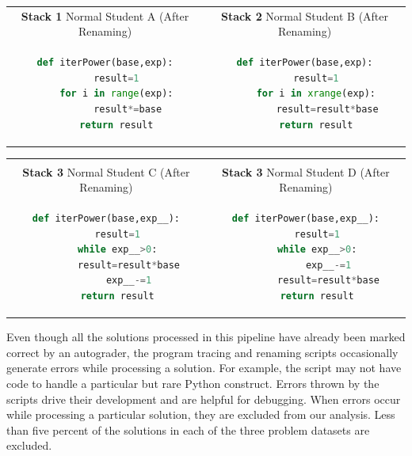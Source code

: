 \begin{tabular}{c|c}
{\bf Stack 1} Normal Student A (After Renaming) & {\bf Stack 2} Normal Student B (After Renaming)  \\
\begin{minipage}{0.5\linewidth}
\begin{lstlisting}[language=python,linebackgroundcolor={\lstcolorlines[lightyellow]{3,4}}]
def iterPower(base,exp):
    result=1
    for i in range(exp):
        result*=base
    return result
\end{lstlisting}
\end{minipage}
&
\begin{minipage}{0.5\linewidth}
\begin{lstlisting}[language=python,linebackgroundcolor={\lstcolorlines[lightyellow]{3,4}}]
def iterPower(base,exp):
    result=1
    for i in xrange(exp):
        result=result*base
    return result
\end{lstlisting}
\end{minipage}
\end{tabular}
\begin{tabular}{cc}
\hline
\\
{\bf Stack 3} Normal Student C (After Renaming) & {\bf Stack 3} Normal Student D (After Renaming)  \\
\begin{minipage}{0.5\linewidth}
\begin{lstlisting}[language=python,linebackgroundcolor={\lstcolorlines[mygray]{4,5}}]
def iterPower(base,exp__):
    result=1
    while exp__>0:
        result=result*base
        exp__-=1
    return result
\end{lstlisting}
\end{minipage}
&
\begin{minipage}{0.5\linewidth}
\begin{lstlisting}[language=python,linebackgroundcolor={\lstcolorlines[mygray]{4,5}}]
def iterPower(base,exp__):
    result=1
    while exp__>0:
        exp__-=1
        result=result*base
    return result
\end{lstlisting}
\end{minipage}
\end{tabular}

Even though all the solutions processed in this pipeline have already been marked correct by an autograder, the program tracing \cite{pgbovineOPT} and renaming scripts occasionally generate errors while processing a solution. For example, the script may not have code to handle a particular but rare Python construct. Errors thrown by the scripts drive their development and are helpful for debugging. When errors occur while processing a particular solution, they are excluded from our analysis. Less than five percent of the solutions in each of the three problem datasets are excluded.

